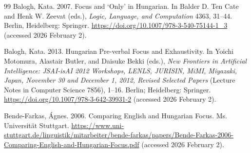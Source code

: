 \documentclass[a4paper, ruler]{CUP-JNL-LIN}%
\begin{document}
\begin{Backmatter}
\begin{thebibliography}{99}
{Balogh, Kata}. 2007. Focus and `Only' in Hungarian. In Balder D. Ten Cate and Henk W. Zeevat (eds.), \textit{Logic, Language, and Computation} 4363, 31--44. Berlin, Heidelberg: Springer. \url{https://doi.org/10.1007/978-3-540-75144-1_3} (accessed 2026 February 2).



{Balogh, Kata}. 2013. Hungarian Pre-verbal Focus and Exhaustivity. In Yoichi Motomura, Alastair Butler, and Daisuke Bekki (eds.), \textit{New Frontiers in Artificial Intelligence: JSAI-isAI 2012 Workshops, LENLS, JURISIN, MiMI, Miyazaki, Japan, November 30 and December 1, 2012, Revised Selected Papers} (Lecture Notes in Computer Science 7856), 1--16. Berlin; Heidelberg: Springer. \url{https://doi.org/10.1007/978-3-642-39931-2} (accessed 2026 February 2).




{Bende-Farkas, Ágnes}. 2006. Comparing English and Hungarian Focus. Ms. Universität Stuttgart. \url{https://www.uni-stuttgart.de/linguistik/mitarbeiter/bende-farkas/papers/Bende-Farkas-2006-Comparing-English-and-Hungarian-Focus.pdf} (accessed 2026 February 2).




\end{thebibliography}
\end{Backmatter}
\end{document}
